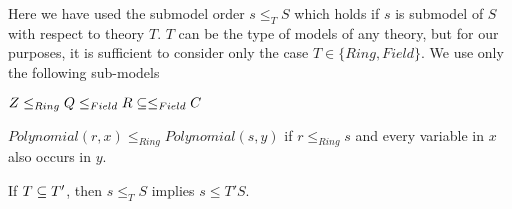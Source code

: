 Here we have used the submodel order $s\leq_T S$ which holds if $s$ is submodel of $S$ with respect to theory $T$.
$T$ can be the type of models of any theory, but for our purposes, it is sufficient to consider only the case $T\in\{Ring,Field\}$.
We use only the following sub-models
\begin{compactitem}
 \item $Z\leq_{Ring} Q\leq_{Field} R\sq\leq_{Field} C$
 \item $Polynomial(r,x)\leq_{Ring} Polynomial(s,y)$ if $r\leq_{Ring} s$ and every variable in $x$ also occurs in $y$.
 \item If $T\sq T'$, then $s\leq_T S$ implies $s\leq{T'}S$.
\end{compactitem}


